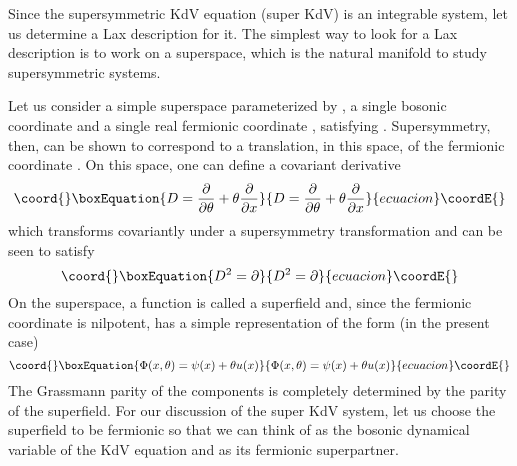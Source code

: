\documentclass[a4paper,11pt]{article}
\begin{document}

Since the supersymmetric KdV equation (super KdV) is an integrable
system, let us determine a Lax description for it. The simplest
way to look for a Lax description is to work on a superspace, which is
the natural manifold to study supersymmetric systems.

Let us consider a simple superspace parameterized by \coordHE{}, a
single bosonic coordinate \coordHE{} and a single real fermionic coordinate
\myHighlight{$\theta$}\coordHE{}, satisfying \coordHE{}. Supersymmetry, then, can be
shown to correspond to a translation, in this space, of the fermionic
coordinate  \myHighlight{$\theta$}\coordHE{}. On this space, one can define a covariant
derivative
\begin{equation}\coord{}\boxEquation{
D = {\partial\over \partial \theta} + \theta {\partial\over \partial
x}
}{
D = {\partial\over \partial \theta} + \theta {\partial\over \partial
x}
}{ecuacion}\coordE{}\end{equation}
which transforms covariantly under a supersymmetry transformation and
can be seen to satisfy
\begin{equation}\coord{}\boxEquation{
D^{2} = \partial
}{
D^{2} = \partial
}{ecuacion}\coordE{}\end{equation}
On the superspace, a function is called a superfield and, since the
fermionic coordinate is nilpotent, has a simple representation of the
form (in the present case)
\begin{equation}\coord{}\boxEquation{
\Phi (x,\theta) = \psi (x) + \theta u(x)
}{
\Phi (x,\theta) = \psi (x) + \theta u(x)
}{ecuacion}\coordE{}\end{equation}
The Grassmann parity of the components is completely determined by the
parity of the superfield. For our discussion of the super KdV system,
let us choose the superfield \myHighlight{$\Phi$}\coordHE{} to be fermionic so that we can
think of \coordHE{} as the bosonic dynamical variable of the KdV equation and
\myHighlight{$\psi$}\coordHE{} as its fermionic superpartner.
\end{document}

